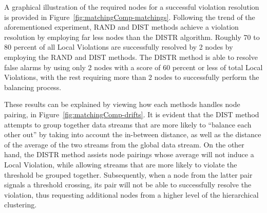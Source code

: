 A graphical illustration of the required nodes for a successful violation resolution is provided in Figure~\ref{fig:matchingComp-matchings}. Following the trend of the aforementioned experiment, RAND and DIST methods achieve a violation resolution by employing far less nodes than the DISTR algorithm. Roughly 70 to 80 percent of all Local Violations are successfully resolved by 2 nodes by employing the RAND and DIST methods. The DISTR method is able to resolve false alarms by using only 2 nodes with a score of 60 percent or less of total Local Violations, with the rest requiring more than 2 nodes to successfully perform the balancing process.

These results can be explained by viewing how each methods handles node pairing, in Figure~\ref{fig:matchingComp-drifts}. It is evident that the DIST method attempts to group together data streams that are more likely to ``balance each other out'' by taking into account the in-between distance, as well as the distance of the average of the two streams from the global data stream. On the other hand, the DISTR method assists node pairings whose average will not induce a Local Violation, while allowing streams that are more likely to violate the threshold be grouped together. Subsequently, when a node from the latter pair signals a threshold crossing, its pair will not be able to successfully resolve the violation, thus requesting additional nodes from a higher level of the hierarchical clustering.

